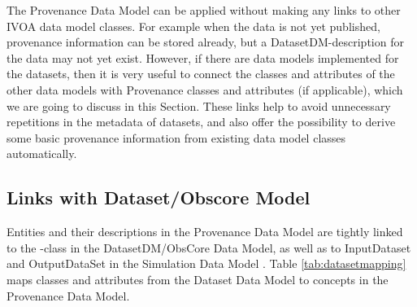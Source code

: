 
The Provenance Data Model can be applied without making any links to other 
IVOA data model classes. For example when the data is not yet published, provenance information
can be stored already, but a DatasetDM-description for the data may not yet exist.
However, if there are data models implemented for the datasets, then it is 
very useful to connect the classes and attributes of the other data models with Provenance classes and attributes (if applicable), which we are going to discuss in this Section. These links help to avoid 
unnecessary repetitions in the metadata of datasets, and also offer the possibility 
to derive some basic provenance information from existing data model classes automatically.


\subsection{Links with Dataset/Obscore Model}
Entities and their descriptions in the Provenance Data Model 
are tightly linked to the -class in the DatasetDM/ObsCore Data Model, as well as to 
InputDataset and OutputDataSet in the Simulation Data Model \citep[SimDM,][]{std:SimDM}.
Table \ref{tab:datasetmapping} maps classes and attributes from the Dataset Data Model 
to concepts in the Provenance Data Model.



